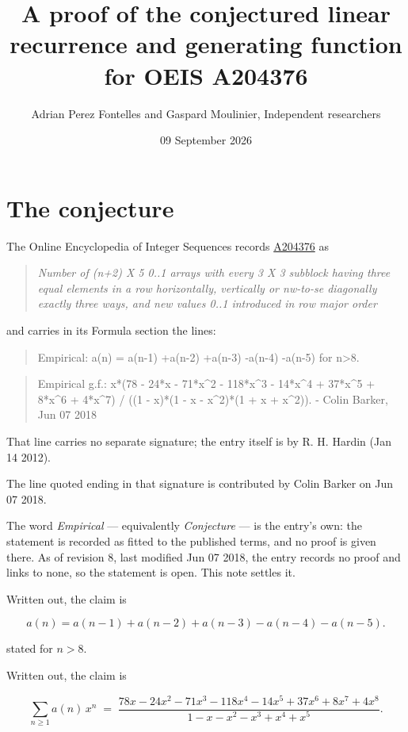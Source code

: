 \documentclass[11pt]{article}
\title{A proof of the conjectured linear recurrence and generating function for OEIS A204376}
\author{Adrian Perez Fontelles and Gaspard Moulinier, Independent researchers}
\date{09 September 2026}
\theoremstyle{definition}
\begin{document}
\maketitle
\section{The conjecture}

The Online Encyclopedia of Integer Sequences records \href{https://oeis.org/A204376}{A204376} as

\begin{quote}\itshape Number of (n+2) X 5 0..1 arrays with every 3 X 3 subblock having three equal elements in a row horizontally, vertically or nw-to-se diagonally exactly three ways, and new values 0..1 introduced in row major order\end{quote}

and carries in its Formula section the lines:

\begin{quote}\ttfamily Empirical: a(n) = a(n-1) +a(n-2) +a(n-3) -a(n-4) -a(n-5) for n>8.\end{quote}

\begin{quote}\ttfamily Empirical g.f.: x*(78 - 24*x - 71*x\textasciicircum{}2 - 118*x\textasciicircum{}3 - 14*x\textasciicircum{}4 + 37*x\textasciicircum{}5 + 8*x\textasciicircum{}6 + 4*x\textasciicircum{}7) / ((1 - x)*(1 - x - x\textasciicircum{}2)*(1 + x + x\textasciicircum{}2)). - Colin Barker, Jun 07 2018\end{quote}

That line carries no separate signature; the entry itself is by R. H. Hardin (Jan 14 2012).

The line quoted ending in that signature is contributed by Colin Barker on Jun 07 2018.

The word {\itshape Empirical} --- equivalently {\itshape Conjecture} --- is the entry's own: the statement is recorded as fitted to the published terms, and no proof is given there. As of revision 8, last modified Jun 07 2018, the entry records no proof and links to none, so the statement is open. This note settles it.

Written out, the claim is

\[a(n) = a(n-1) + a(n-2) + a(n-3) - a(n-4) - a(n-5).\]

stated for $n > 8$.

Written out, the claim is

\[\sum_{n \ge 1} a(n)\,x^n \;=\; \frac{78x - 24x^{2} - 71x^{3} - 118x^{4} - 14x^{5} + 37x^{6} + 8x^{7} + 4x^{8}}{1 - x - x^{2} - x^{3} + x^{4} + x^{5}}.\]
\end{document}
